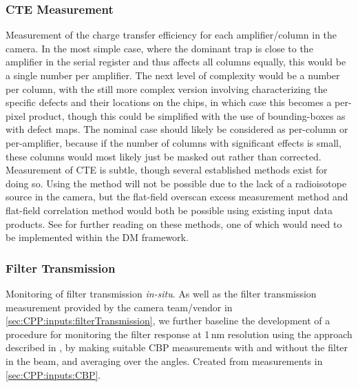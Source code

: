 \subsubsection{CTE Measurement}\label{sec:CPP:output:CTE}
Measurement of the charge transfer efficiency for each amplifier/column in the camera. In the most simple case, where the dominant trap is close to the amplifier in the serial register and thus affects all columns equally, this would be a single number per amplifier. The next level of complexity would be a number per column, with the still more complex version involving characterizing the specific defects and their locations on the chips, in which case this becomes a per-pixel product, though this could be simplified with the use of bounding-boxes as with defect maps. The nominal case should likely be considered as per-column or per-amplifier, because if the number of columns with significant effects is small, these columns would most likely just be masked out rather than corrected.
\alg Measurement of CTE is subtle, though several established methods exist for doing so. Using the \fefiftyfive method will not be possible due to the lack of a radioisotope source in the camera, but the flat-field overscan excess measurement method and flat-field correlation method would both be possible using existing input data products. See  for further reading on these methods, one of which would need to be implemented within the DM framework.


\subsubsection{Filter Transmission}\label{sec:CPP:output:filterTransmission}
Monitoring of filter transmission \emph{in-situ}. As well as the filter transmission measurement provided by the camera team/vendor in \secsymbol\ref{sec:CPP:inputs:filterTransmission}, we further baseline the development of a procedure for monitoring the filter response at 1\,nm resolution using the approach described in \cite{Lupton15}, \ie by making suitable CBP measurements with and without the filter in the beam, and averaging over the angles.
\alg Created from measurements in \secsymbol\ref{sec:CPP:inputs:CBP}.


